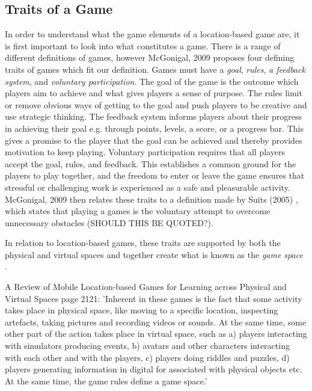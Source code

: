 \subsection{Traits of a Game}
In order to understand what the game elements of a location-based game are, it is first important to look into what constitutes a game. There is a range of different definitions of games, however McGonigal, 2009 \cite{RealityIsBroken} proposes four defining traits of games which fit our definition. Games must have a \textit{goal}, \textit{rules}, \textit{a feedback system}, and \textit{voluntary participation}. The goal of the game is the outcome which players aim to achieve and what gives players a sense of purpose. The rules limit or remove obvious ways of getting to the goal and push players to be creative and use strategic thinking. The feedback system informs players about their progress in achieving their goal e.g. through points, levels, a score, or a progress bar. This gives a promise to the player that the goal can be achieved and thereby provides motivation to keep playing. Voluntary participation requires that all players accept the goal, rules, and feedback. This establishes a common ground for the players to play together, and the freedom to enter or leave the game ensures that stressful or challenging work is experienced as a safe and pleasurable activity. McGonigal, 2009 then relates these traits to a definition made by Suits (2005) \cite{grasshopper}, which states that playing a games is the voluntary attempt to overcome unnecessary obstacles (SHOULD THIS BE QUOTED?). 

In relation to location-based games, these traits are supported by both the physical and virtual spaces and together create what is known as the \textit{game space} \cite{LBG_Review}. 


A Review of Mobile Location-based Games for Learning across Physical and Virtual Spaces page 2121:
'Inherent in these games is the fact that some activity takes place in physical space, like moving to a specific location, inspecting artefacts, taking pictures and recording videos or sounds. At the same time, some other part of the action takes place in virtual space, such as a) players interacting with simulators producing events, b) avatars and other characters interacting with each other and with the players, c) players doing riddles and puzzles, d) players generating information in digital for associated with physical objects etc. At the same time, the game rules define a game space.'

